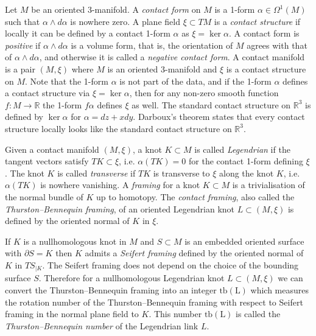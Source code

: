 \documentclass[11pt]{amsart}
\theoremstyle{remark}
\theoremstyle{definition}
\begin{document}
	Let $M$ be an oriented 3-manifold. A \emph{contact form} on $M$ is a 1-form $\alpha \in \Omega^1(M)$ such that $\alpha \wedge d\alpha$ is nowhere zero. A plane field $\xi \subset TM$ is a \emph{contact structure} if locally it can be defined by a contact 1-form $\alpha$ as $\xi = \ker \alpha$. A contact form is \emph{positive} if $\alpha \wedge d\alpha$ is a volume form, that is, the orientation of $M$ agrees with that of $\alpha \wedge d\alpha$, and otherwise it is called a \emph{negative contact form}. A contact manifold is a pair $(M , \xi)$ where $M$ is an oriented 3-manifold and $\xi$ is a contact structure on $M$. Note that the 1-form $\alpha$ is not part of the data, and if the 1-form $\alpha$ defines a contact structure via $\xi = \ker \alpha$, then for any non-zero smooth function $f \colon M \rightarrow \mathbb{R}$ the 1-form $f \alpha$ defines $\xi$ as well. The standard contact structure on $\mathbb{R}^3$ is defined by $\ker \alpha$ for $\alpha = dz + x dy $. Darboux's theorem states that every contact structure locally looks like the standard contact structure on $\mathbb{R}^3$. 
	
	Given a contact manifold $(M , \xi)$, a knot $K  \subset M$ is called \emph{Legendrian} if the tangent vectors satisfy $TK \subset \xi$, i.e. $\alpha (TK) =0$  for the contact 1-form defining $\xi$. The knot $K$ is called \emph{transverse} if $TK$ is transverse to $\xi$ along the knot $K$, i.e. $\alpha(TK)$ is nowhere vanishing. A \emph{framing} for a knot $K \subset M$ is a trivialisation of the normal bundle of $K$ up to homotopy. The \emph{contact framing}, also called the \emph{Thurston--Bennequin framing}, of an oriented Legendrian knot $L \subset (M , \xi)$ is defined by the oriented normal of $K$ in $\xi$. 
	
	If $K$ is a nullhomologous knot in $M$ and $S \subset M$ is an embedded oriented surface with $\partial S = K$ then $K$ admits a \emph{Seifert framing} defined by the oriented normal of $K$ in $TS_{|K}$. The Seifert framing does not depend on the choice of the bounding surface $S$. Therefore for a nullhomologous Legendrian knot $L \subset (M , \xi)$ we can convert the Thurston--Bennequin framing into an integer $\mathrm{tb(L)}$ which measures the rotation number of the Thurston--Bennequin framing with respect to Seifert framing in the normal plane field to $K$. This number $\mathrm{tb(L)}$ is called the \emph{Thurston--Bennequin number} of the Legendrian link $L$. 
	
\end{document}
